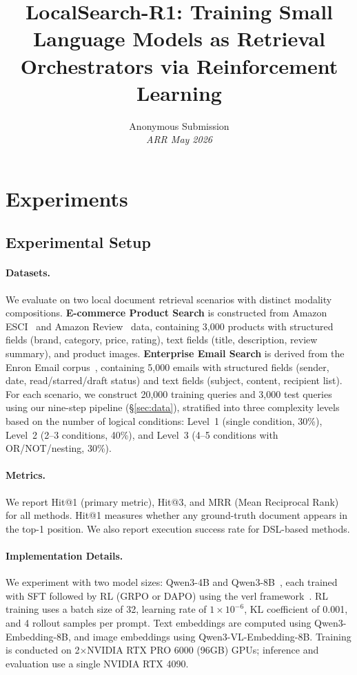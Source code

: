 \documentclass[11pt]{article}
\title{LocalSearch-R1: Training Small Language Models as Retrieval Orchestrators via Reinforcement Learning}
\author{
  Anonymous Submission \\
  \textit{ARR May 2026}
}
\begin{document}
\maketitle

\section{Experiments}
\label{sec:experiments}

\subsection{Experimental Setup}
\label{sec:setup}

\paragraph{Datasets.}
We evaluate on two local document retrieval scenarios with distinct modality compositions.
\textbf{E-commerce Product Search} is constructed from Amazon ESCI~\cite{reddy2022shopping} and Amazon Review~\cite{ni2019justifying} data, containing 3{,}000 products with structured fields (brand, category, price, rating), text fields (title, description, review summary), and product images.
\textbf{Enterprise Email Search} is derived from the Enron Email corpus~\cite{klimt2004enron}, containing 5{,}000 emails with structured fields (sender, date, read/starred/draft status) and text fields (subject, content, recipient list).
For each scenario, we construct 20{,}000 training queries and 3{,}000 test queries using our nine-step pipeline (\S\ref{sec:data}), stratified into three complexity levels based on the number of logical conditions: Level~1 (single condition, 30\%), Level~2 (2--3 conditions, 40\%), and Level~3 (4--5 conditions with OR/NOT/nesting, 30\%).

\paragraph{Metrics.}
We report Hit@1 (primary metric), Hit@3, and MRR (Mean Reciprocal Rank) for all methods. Hit@1 measures whether any ground-truth document appears in the top-1 position. We also report execution success rate for DSL-based methods.

\paragraph{Implementation Details.}
We experiment with two model sizes: Qwen3-4B and Qwen3-8B~\cite{yang2025qwen3}, each trained with SFT followed by RL (GRPO or DAPO) using the verl framework~\cite{sheng2024hybridflow}.
RL training uses a batch size of 32, learning rate of $1 \times 10^{-6}$, KL coefficient of 0.001, and 4 rollout samples per prompt.
Text embeddings are computed using Qwen3-Embedding-8B, and image embeddings using Qwen3-VL-Embedding-8B.
Training is conducted on 2$\times$NVIDIA RTX PRO 6000 (96GB) GPUs; inference and evaluation use a single NVIDIA RTX 4090.
\end{document}
